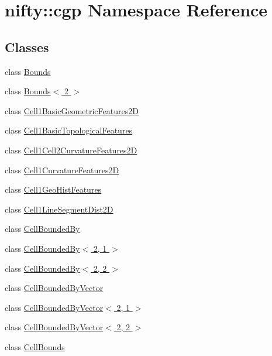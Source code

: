 \hypertarget{namespacenifty_1_1cgp}{}\section{nifty\+:\+:cgp Namespace Reference}
\label{namespacenifty_1_1cgp}
\subsection*{Classes}
\begin{DoxyCompactItemize}
\item 
class \hyperlink{classnifty_1_1cgp_1_1Bounds}{Bounds}
\item 
class \hyperlink{classnifty_1_1cgp_1_1Bounds_3_012_01_4}{Bounds$<$ 2 $>$}
\item 
class \hyperlink{classnifty_1_1cgp_1_1Cell1BasicGeometricFeatures2D}{Cell1\+Basic\+Geometric\+Features2\+D}
\item 
class \hyperlink{classnifty_1_1cgp_1_1Cell1BasicTopologicalFeatures}{Cell1\+Basic\+Topological\+Features}
\item 
class \hyperlink{classnifty_1_1cgp_1_1Cell1Cell2CurvatureFeatures2D}{Cell1\+Cell2\+Curvature\+Features2\+D}
\item 
class \hyperlink{classnifty_1_1cgp_1_1Cell1CurvatureFeatures2D}{Cell1\+Curvature\+Features2\+D}
\item 
class \hyperlink{classnifty_1_1cgp_1_1Cell1GeoHistFeatures}{Cell1\+Geo\+Hist\+Features}
\item 
class \hyperlink{classnifty_1_1cgp_1_1Cell1LineSegmentDist2D}{Cell1\+Line\+Segment\+Dist2\+D}
\item 
class \hyperlink{classnifty_1_1cgp_1_1CellBoundedBy}{Cell\+Bounded\+By}
\item 
class \hyperlink{classnifty_1_1cgp_1_1CellBoundedBy_3_012_00_011_01_4}{Cell\+Bounded\+By$<$ 2, 1 $>$}
\item 
class \hyperlink{classnifty_1_1cgp_1_1CellBoundedBy_3_012_00_012_01_4}{Cell\+Bounded\+By$<$ 2, 2 $>$}
\item 
class \hyperlink{classnifty_1_1cgp_1_1CellBoundedByVector}{Cell\+Bounded\+By\+Vector}
\item 
class \hyperlink{classnifty_1_1cgp_1_1CellBoundedByVector_3_012_00_011_01_4}{Cell\+Bounded\+By\+Vector$<$ 2, 1 $>$}
\item 
class \hyperlink{classnifty_1_1cgp_1_1CellBoundedByVector_3_012_00_012_01_4}{Cell\+Bounded\+By\+Vector$<$ 2, 2 $>$}
\item 
class \hyperlink{classnifty_1_1cgp_1_1CellBounds}{Cell\+Bounds}

\end{DoxyCompactItemize}
